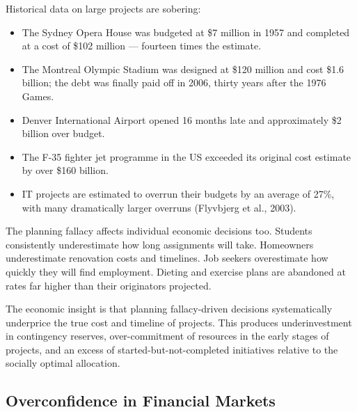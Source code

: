\documentclass[12pt, letterpaper]{article}
\begin{document}
Historical data on large projects are sobering:
\begin{itemize}
\item The Sydney Opera House was budgeted at \$7 million in 1957 and completed at a cost of \$102 million --- fourteen times the estimate.
\item The Montreal Olympic Stadium was designed at \$120 million and cost \$1.6 billion; the debt was finally paid off in 2006, thirty years after the 1976 Games.
\item Denver International Airport opened 16 months late and approximately \$2 billion over budget.
\item The F-35 fighter jet programme in the US exceeded its original cost estimate by over \$160 billion.
\item IT projects are estimated to overrun their budgets by an average of 27\%, with many dramatically larger overruns (Flyvbjerg et al., 2003).
\end{itemize}

The planning fallacy affects individual economic decisions too. Students consistently underestimate how long assignments will take. Homeowners underestimate renovation costs and timelines. Job seekers overestimate how quickly they will find employment. Dieting and exercise plans are abandoned at rates far higher than their originators projected.

The economic insight is that planning fallacy-driven decisions systematically underprice the true cost and timeline of projects. This produces underinvestment in contingency reserves, over-commitment of resources in the early stages of projects, and an excess of started-but-not-completed initiatives relative to the socially optimal allocation.

\medskip


\subsection{Overconfidence in Financial Markets}
\end{document}
